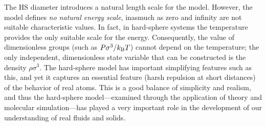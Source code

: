 \documentclass[]{article}
\begin{document}
The HS diameter introduces a natural length scale for the model.
However, the model defines \emph{no natural energy scale}, inasmuch as
zero and infinity are not suitable characteristic values. In fact, in
hard-sphere systems the temperature provides the only suitable scale for
the energy. Consequently, the value of dimensionless groups (such as
$P\sigma^3/k_{\rm B}T$) cannot depend on the temperature; the only
independent, dimensionless state variable that can be constructed is the
density $\rho\sigma^3$. The hard-sphere model has important
simplifying features such as this, and yet it captures an essential
feature (harsh repulsion at short distances) of the behavior of real
atoms. This is a good balance of simplicity and realism, and thus the
hard-sphere model---examined through the application of theory and
molecular simulation---has played a very important role in the
development of our understanding of real fluids and solids.
\end{document}
